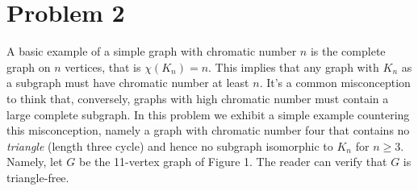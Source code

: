 \documentclass[14pt]{extarticle}
\begin{document}
\section{Problem 2}
A basic example of a simple graph with chromatic number $n$ is the complete graph on $n$ vertices, that is $\chi (K_n) = n$. This implies that any graph with $K_n$ as a subgraph must have chromatic number at least $n$. It’s a common misconception to think that, conversely, graphs with high chromatic number must contain a large complete subgraph. In this problem we exhibit a simple example countering this misconception, namely a graph with chromatic number four that contains no {\it triangle} (length three cycle) and hence no subgraph isomorphic to $K_n$ for $n \geq 3$. Namely, let $G$ be the 11-vertex graph of Figure 1. The reader can verify that $G$ is triangle-free.
\begin{center}
\end{center}
\end{document}

